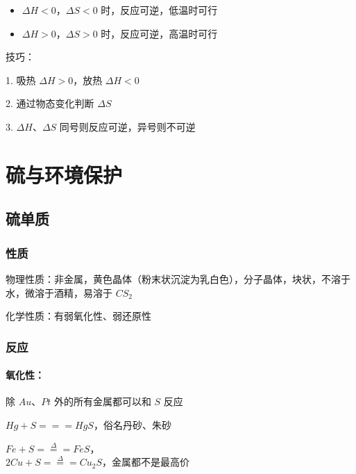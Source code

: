 \documentclass[UTF8,zihao=-4,openany]{ctexbook}
\begin{document}
\begin{itemize}
\item $\Delta H<0$，$\Delta S<0$ 时，反应可逆，低温时可行
\end{itemize}

\begin{itemize}
\item $\Delta H>0$，$\Delta S>0$ 时，反应可逆，高温时可行
\end{itemize}

技巧：\par

1. 吸热 $\Delta H>0$，放热 $\Delta H<0$\par

2. 通过物态变化判断 $\Delta S$\par

3. $\Delta H$、$\Delta S$ 同号则反应可逆，异号则不可逆\par
\chapter{硫与环境保护}
\section{硫单质}
\subsection{性质}
物理性质：非金属，黄色晶体（粉末状沉淀为乳白色），分子晶体，块状，不溶于水，微溶于酒精，易溶于 $CS_2$\par

化学性质：有弱氧化性、弱还原性\par
\subsection{反应}
\subsubsection{氧化性：}
除 $Au$、$Pt$ 外的所有金属都可以和 $S$ 反应\par

$Hg+S=\!=\!=HgS$，俗名丹砂、朱砂\par

$Fe+S\stackrel{\Delta}{=\!=\!=}FeS$，\\[0.25em]
\hspace*{2em}$2Cu+S\stackrel{\Delta}{=\!=\!=}Cu_2S$，金属都不是最高价\par
\end{document}
